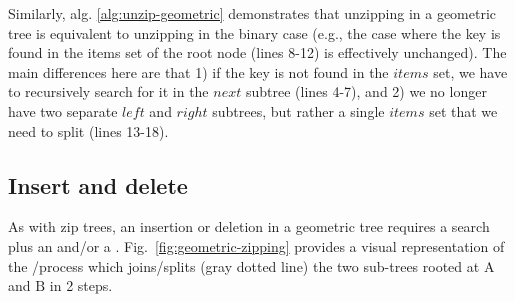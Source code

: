 \documentclass{article}
\begin{document}
\begin{algorithm}[!htb]
    \caption{Unzip function for geometric trees}\label{alg:unzip-geometric}
    \DontPrintSemicolon

\end{algorithm}

Similarly, alg. \ref{alg:unzip-geometric} demonstrates that unzipping in a geometric tree is equivalent to unzipping in the binary case (e.g., the case where the key is found in the items set of the root node (lines 8-12) is effectively unchanged). The main differences here are that 1) if the key is not found in the $items$ set, we have to recursively search for it in the $next$ subtree (lines 4-7), and 2) we no longer have two separate $left$ and $right$ subtrees, but rather a single $items$ set that we need to split (lines 13-18).

\subsection{Insert and delete}

As with zip trees, an insertion or deletion in a geometric tree requires a search plus an \unzip and/or a \zip. Fig.~\ref{fig:geometric-zipping} provides a visual representation of the \zip/\unzip process which joins/splits (gray dotted line) the two sub-trees rooted at $\text{A}$ and $\text{B}$ in 2 steps.
\end{document}
